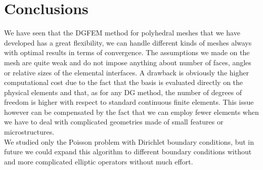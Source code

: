 \documentclass[12pt, a4paper]{article}
\theoremstyle{definition}
\theoremstyle{plain}
\theoremstyle{plain}
\begin{document}
\section{Conclusions}\label{sec:conc}
We have seen that the DGFEM method for polyhedral meshes that we have developed 
has a great flexibility, we can handle different kinds of meshes always with 
optimal results in terms of convergence. The assumptions we made on the mesh 
are quite weak and do not impose anything about number of faces, angles or 
relative sizes of the elemental interfaces. A drawback is obviously the higher 
computational cost due to the fact that the basis is evaluated directly on the 
physical elements and that, as for any DG method, the number of degrees of 
freedom is higher with respect to standard continuous finite elements. This 
issue however can be compensated by the fact that we can employ fewer elements 
when we have to deal with complicated geometries made of small features or 
microstructures.\\
We studied only the Poisson problem with Dirichlet boundary conditions, but in 
future we could expand this algorithm to different boundary conditions without 
and more complicated elliptic operators without much effort.
\end{document}
